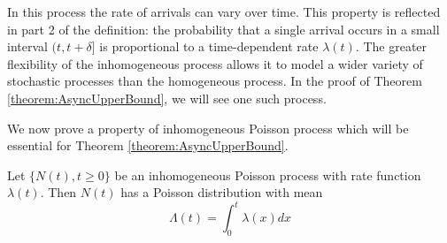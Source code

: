 In this process the rate of arrivals can vary over time. This property is reflected in part 2 of the definition: the probability that a single arrival occurs in a small interval $(t, t+\delta]$ is proportional to a time-dependent rate $\lambda(t)$. The greater flexibility of the inhomogeneous process allows it to model a wider variety of stochastic processes than the homogeneous process. In the proof of Theorem \ref{theorem:AsyncUpperBound}, we will see one such process.

We now prove a property of inhomogeneous Poisson process which will be essential for Theorem \ref{theorem:AsyncUpperBound}. 

\begin{theorem}\label{theorem:inhomoPoissonIncrements}
	Let $\{N(t), t \geq 0\}$ be an inhomogeneous Poisson process with rate function $\lambda(t)$. Then $N(t)$ has a Poisson distribution with mean
	$$
		\Lambda(t) = \int_0^t \lambda(x) dx
	$$
\end{theorem}

